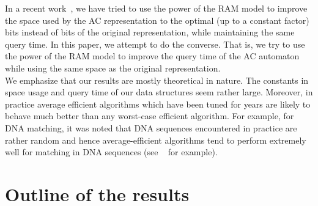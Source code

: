 \documentclass{article}
\newcommand{\?}{\mskip1.5mu}
\begin{document}
In a recent work~\cite{B10a}, we have tried to use the power of the RAM model to improve the space used by the AC representation to the optimal (up to a constant factor)  bits instead of  bits of the original representation, while maintaining the same query time. In this paper, we attempt to do the converse. That is, we try to use the power of the RAM model to improve the query time of the AC automaton while using the same space as the original representation. 
\\
We emphasize that our results are mostly theoretical in nature. The constants in space usage and query time of our data structures seem rather large. Moreover, in practice average efficient algorithms which have been tuned for years are likely to behave much better than any worst-case efficient algorithm. For example, for DNA matching, it was noted that DNA sequences encountered in practice are rather random and hence average-efficient algorithms tend to perform extremely well for matching in DNA sequences (see ~\cite{RSKKT09} for example). 
\section{Outline of the results}
\end{document}
